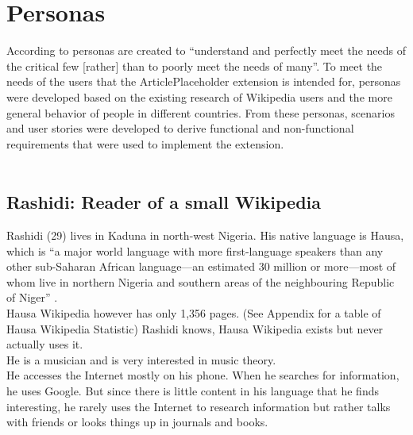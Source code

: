 \chapter{Personas}

According to \citet[182]{design:01} personas are created to ``understand and perfectly meet the needs of the critical few [rather] than to poorly meet the needs of many''. To meet the needs of the users that the ArticlePlaceholder extension is intended for, personas were developed based on the existing research of Wikipedia users and the more general behavior of people in different countries. From these personas, scenarios and user stories were developed to derive functional and non-functional requirements that were used to implement the extension. \\
\\
\section{Rashidi: Reader of a small Wikipedia}
Rashidi (29) lives in Kaduna in north-west Nigeria. His native language is Hausa, which is ``a major world language with more first-language speakers than any other sub-Saharan African language---an estimated 30 million or more---most of whom live in northern Nigeria and southern areas of the neighbouring Republic of Niger'' \cite[p1]{hausa}. \\
Hausa Wikipedia however has only 1,356 pages. (See Appendix for a table of Hausa Wikipedia Statistic) Rashidi knows, Hausa Wikipedia exists but never actually uses it. \\
He is a musician and is very interested in music theory. \\
He accesses the Internet mostly on his phone. When he searches for information, he uses Google. But since there is little content in his language that he finds interesting, he rarely uses the Internet to research information but rather talks with friends or looks things up in journals and books.


